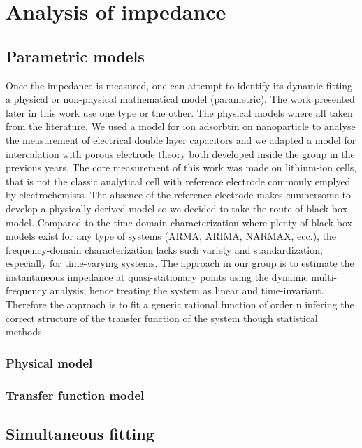 \chapter{Analysis of impedance}
\minitoc

\section{Parametric models}
Once the impedance is measured, one can attempt to identify its dynamic fitting a physical or non-physical mathematical model (parametric). The work presented later in this work use one type or the other. The physical models where all taken from the literature. We used a model for ion adsorbtin on nanoparticle to analyse the measurement of electrical double layer capacitors and we adapted a model for intercalation with porous electrode theory both developed inside the group in the previous years. The core measurement of this work was made on lithium-ion cells, that is not the classic analytical cell with reference electrode commonly emplyed by electrochemists. The absence of the reference electrode makes cumbersome to develop a physically derived model so we decided to take the route of black-box model. Compared to the time-domain characterization where plenty of black-box models exist for any type of systems (ARMA, ARIMA, NARMAX, ecc.), the frequency-domain characterization lacks such variety and standardization, especially for time-varying systems. The approach in our group is to estimate the instantaneous impedance at quasi-stationary points using the dynamic multi-frequency analysis, hence treating the system as linear and time-invariant. Therefore the approach is to fit a generic rational function of order n infering the correct structure of the transfer function of the system though statistical methods. 

\subsection{Physical model}

\subsection{Transfer function model}


\section{Simultaneous fitting}

